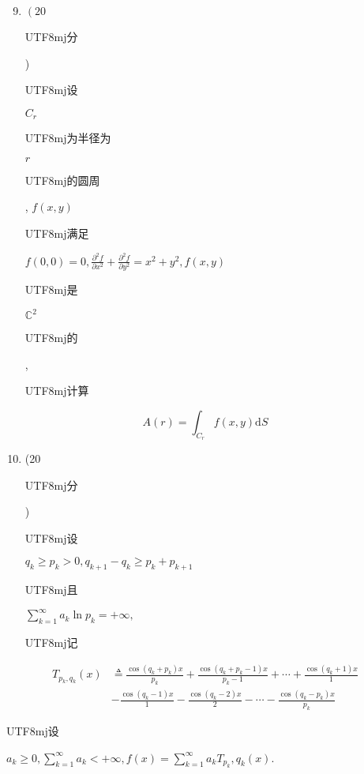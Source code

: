 \documentclass[10pt]{article}
\begin{document}
\begin{enumerate}
  \setcounter{enumi}{8}
  \item $\left(20\right.$ \begin{CJK}{UTF8}{mj}分\end{CJK}) \begin{CJK}{UTF8}{mj}设\end{CJK} $C_{r}$ \begin{CJK}{UTF8}{mj}为半径为\end{CJK} $r$ \begin{CJK}{UTF8}{mj}的圆周\end{CJK}, $f(x, y)$ \begin{CJK}{UTF8}{mj}满足\end{CJK} $f(0,0)=0, \frac{\partial^{2} f}{\partial x^{2}}+\frac{\partial^{2} f}{\partial y^{2}}=x^{2}+y^{2}, f(x, y)$ \begin{CJK}{UTF8}{mj}是\end{CJK} $\mathbb{C}^{2}$ \begin{CJK}{UTF8}{mj}的\end{CJK}, \begin{CJK}{UTF8}{mj}计算\end{CJK}
\end{enumerate}
$$
A(r)=\int_{C_{r}} f(x, y) \mathrm{d} S
$$

\begin{enumerate}
  \setcounter{enumi}{9}
  \item (20 \begin{CJK}{UTF8}{mj}分\end{CJK}) \begin{CJK}{UTF8}{mj}设\end{CJK} $q_{k} \geq p_{k}>0, q_{k+1}-q_{k} \geq p_{k}+p_{k+1}$ \begin{CJK}{UTF8}{mj}且\end{CJK} $\sum_{k=1}^{\infty} a_{k} \ln p_{k}=+\infty, \quad$ \begin{CJK}{UTF8}{mj}记\end{CJK}
\end{enumerate}
$$
\begin{aligned}
T_{p_{k}, q_{k}}(x) & \triangleq \frac{\cos \left(q_{k}+p_{k}\right) x}{p_{k}}+\frac{\cos \left(q_{k}+p_{k}-1\right) x}{p_{k}-1}+\cdots+\frac{\cos \left(q_{k}+1\right) x}{1} \\
&-\frac{\cos \left(q_{k}-1\right) x}{1}-\frac{\cos \left(q_{k}-2\right) x}{2}-\cdots-\frac{\cos \left(q_{k}-p_{k}\right) x}{p_{k}}
\end{aligned}
$$
\begin{CJK}{UTF8}{mj}设\end{CJK} $a_{k} \geq 0, \sum_{k=1}^{\infty} a_{k}<+\infty, f(x)=\sum_{k=1}^{\infty} a_{k} T_{p_{k}}, q_{k}(x)$.
\end{document}
